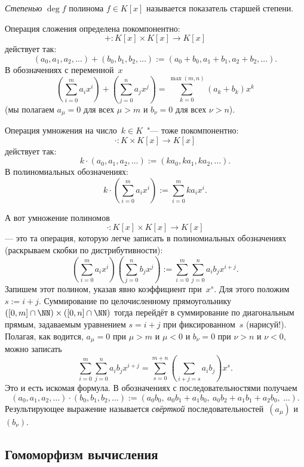 \begin{definition}
	\emph{Степенью} $\deg{f}$ полинома $f \in K[x]$ называется показатель старшей степени.
\end{definition}

Операция сложения определена покомпонентно:
\[
	+\colon
	K[x] \times K[x]
	\to
	K[x]
\]
действует так:
\[
	(a_0, a_1, a_2, \dots)
	+
	(b_0, b_1, b_2, \dots)
	:=
	(a_0 + b_0, a_1 + b_1, a_2 + b_2, \dots)
	.
\]
В обозначениях с переменной~$x$
\[
	\left( 
		\sum_{i = 0}^{m}
			a_i x^i
	\right)
	+
	\left( 
		\sum_{j = 0}^{n}
			a_j x^j
	\right)
	=
	\sum_{k = 0}^{\max(m, n)}
		(a_k + b_k) x^k
\]
(мы полагаем $a_\mu = 0$ для всех $\mu > m$ и $b_\nu = 0$ для всех $\nu > n$).

Операция умножения на число~$k \in K$~"--- тоже покомпонентно:
\[
	\cdot \colon
	K \times K[x]
	\to
	K[x]
\]
действует так:
\[
	k \cdot
	(a_0, a_1, a_2, \dots)
	:=
	(ka_0, ka_1, ka_2, \dots)
	.
\]
В полиномиальных обозначениях:
\[
	k \cdot
	\left( 
		\sum_{i = 0}^m
			a_i x^i
	\right)
	:=
	\sum_{i = 0}^m
		ka_i x^i
	.
\]

А вот умножение полиномов
\[
	\cdot \colon
	K[x] \times K[x] \to K[x]
\]
--- это та операция, которую легче записать в полиномиальных обозначениях (раскрываем скобки по дистрибутивности):
\[
	\left( 
		\sum_{i = 0}^{m}
			a_i x^i
	\right)
	\left( 
		\sum_{j = 0}^{n}
			b_j x^j
	\right)
	:=
	\sum_{i = 0}^m
	\sum_{j = 0}^n
		a_i b_j x^{i+j}
	.
\]
Запишем этот полином, указав явно коэффициент при~$x^s$. Для этого положим $s := i+j$. Суммирование по целочисленному прямоугольнику $([0, m] \cap \NN) \times ([0, n] \cap \NN)$ тогда перейдёт в суммирование по диагональным прямым, задаваемым уравнением $s = i + j$ при фиксированном~$s$ (нарисуй!). Полагая, как водится, $a_\mu = 0$ при $\mu > m$ и $\mu < 0$ и $b_\nu = 0$ при $\nu > n$ и $\nu < 0$, можно записать
\[
	\sum_{i = 0}^m
	\sum_{j = 0}^n
		a_i b_j x^{i+j}
	=
	\sum_{s = 0}^{m+n}
		\left( 
			\sum_{i + j = s}
				a_i b_j
		\right)
		x^s
		.
\]
Это и есть искомая формула. В обозначениях с последовательностями получаем
\[
	(a_0, a_1, a_2, \dots)
	\cdot
	(b_0, b_1, b_2, \dots)
	:=
	( 
		a_0 b_0
		,\ 
		a_0 b_1 + a_1 b_0
		,\ 
		a_0 b_2 + a_1 b_1 + a_2 b_0
		,\ 
		\dots
	).
\]
Результирующее выражение называется \emph{свёрткой} последовательностей~$(a_\mu)$ и~$(b_\nu)$.

\subsection{Гомоморфизм вычисления}

